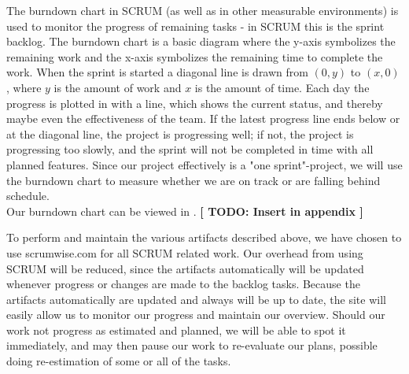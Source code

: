 The burndown chart in SCRUM (as well as in other measurable environments) is used to monitor the progress of remaining tasks - in SCRUM this is the sprint backlog.
The burndown chart is a basic diagram where the y-axis symbolizes the remaining work and the x-axis symbolizes the remaining time to complete the work.
When the sprint is started a diagonal line is drawn from $(0, y)$ to $(x, 0)$, where $y$ is the amount of work and $x$ is the amount of time.
Each day the progress is plotted in with a line, which shows the current status, and thereby maybe even the effectiveness of the team. If the latest progress line ends below or at the diagonal line, the project is progressing well; if not, the project is progressing too slowly, and the sprint will not be completed in time with all planned features.
Since our project effectively is a "one sprint"-project, we will use the burndown chart to measure whether we are on track or are falling behind schedule.\\
Our burndown chart can be viewed in . \textbf{[ TODO: Insert in appendix ]}

To perform and maintain the various artifacts described above, we have chosen to use scrumwise.com for all SCRUM related work. Our overhead from using SCRUM will be reduced, since the artifacts automatically will be updated whenever progress or changes are made to the backlog tasks.
Because the artifacts automatically are updated and always will be up to date, the site will easily allow us to monitor our progress and maintain our overview. Should our work not progress as estimated and planned, we will be able to spot it immediately, and may then pause our work to re-evaluate our plans, possible doing re-estimation of some or all of the tasks.